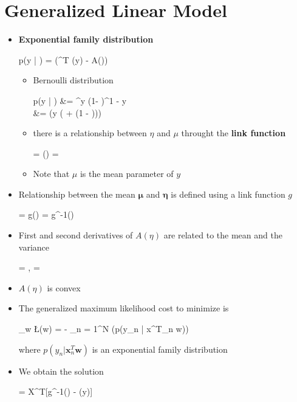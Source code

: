 \section{Generalized Linear Model}
\begin{itemize}
	\item \textbf{Exponential family distribution}
	\begin{myalign*}
	    p(\*y | \bm \eta) =  \exp(\bm \eta^T \bm \phi(\*y) - A(\bm \eta))
	\end{myalign*}
	\begin{itemize}
		\item Bernoulli distribution
		\begin{myalign*}
		    p(y | \mu) &= \mu^y (1- \mu)^{1 - y}\\
		    &= \exp(y \log( + \log(1 - \mu)))
		\end{myalign*}
		\item there is a relationship between $\eta$ and $\mu$ throught the \textbf{link function}
		\begin{myalign*}
		    \eta = \log() \leftrightarrow \mu = \frac{e^{\eta}}{1 + e^{\eta}}
		\end{myalign*}
		\item Note that $\mu$ is the mean parameter of $y$
	\end{itemize}
	\item Relationship between the mean $\bm \mu$ and $\bm \eta$ is defined using a link function $g$
	\begin{myalign*}
	    \bm \eta = \*g(\bm \mu) \Leftrightarrow \bm \mu = \*g^{-1}(\bm \eta)
	\end{myalign*}
	\item First and second derivatives of $A(\eta)$ are related to the mean and the variance
	\begin{myalign*}
	     = \E[\bm \phi(\eta)], \hspace{4pt}  = \V[\bm \phi(\eta)]
	\end{myalign*}
	\item $A(\eta)$ is convex
	\item The generalized maximum likelihood cost to minimize is
	\begin{myalign*}
	    \min_{\bm w} \L(\bm w) = - \sum_{n = 1}^N \log(p(y_n | \bm x^T_n \bm w))
	\end{myalign*}
	where $p(y_n | \bm x^T_n \bm w)$ is an exponential family distribution
	\item We obtain the solution
	\begin{myalign*}
	     = \*X^T[\*g^{-1}(\bm \eta) - \bm \phi(\*y)]
	\end{myalign*}
\end{itemize}

